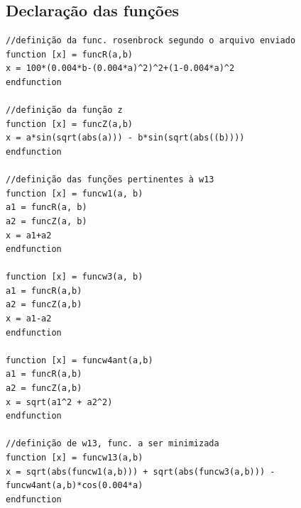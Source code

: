 \subsection*{Declaração das funções}

\begin{verbatim}
//definição da func. rosenbrock segundo o arquivo enviado
function [x] = funcR(a,b)
x = 100*(0.004*b-(0.004*a)^2)^2+(1-0.004*a)^2
endfunction

//definição da função z
function [x] = funcZ(a,b)
x = a*sin(sqrt(abs(a))) - b*sin(sqrt(abs((b))))
endfunction

//definição das funções pertinentes à w13
function [x] = funcw1(a, b)
a1 = funcR(a, b)
a2 = funcZ(a, b)
x = a1+a2
endfunction

function [x] = funcw3(a, b)
a1 = funcR(a,b)
a2 = funcZ(a,b)
x = a1-a2
endfunction

function [x] = funcw4ant(a,b)
a1 = funcR(a,b)
a2 = funcZ(a,b)
x = sqrt(a1^2 + a2^2)
endfunction

//definição de w13, func. a ser minimizada
function [x] = funcw13(a,b)
x = sqrt(abs(funcw1(a,b))) + sqrt(abs(funcw3(a,b))) - funcw4ant(a,b)*cos(0.004*a)
endfunction

\end{verbatim}

